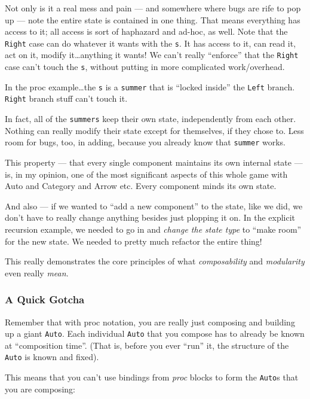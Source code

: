 \documentclass[]{article}
\begin{document}
Not only is it a real mess and pain --- and somewhere where bugs are rife to pop
up --- note the entire state is contained in one thing. That means everything
has access to it; all access is sort of haphazard and ad-hoc, as well. Note that
the \texttt{Right} case can do whatever it wants with the \texttt{s}. It has
access to it, can read it, act on it, modify it\ldots anything it wants! We
can't really ``enforce'' that the \texttt{Right} case can't touch the
\texttt{s}, without putting in more complicated work/overhead.

In the proc example\ldots the \texttt{s} is a \texttt{summer} that is ``locked
inside'' the \texttt{Left} branch. \texttt{Right} branch stuff can't touch it.

In fact, all of the \texttt{summers} keep their own state, independently from
each other. Nothing can really modify their state except for themselves, if they
chose to. Less room for bugs, too, in adding, because you already know that
\texttt{summer} works.

This property --- that every single component maintains its own internal state
--- is, in my opinion, one of the most significant aspects of this whole game
with Auto and Category and Arrow etc. Every component minds its own state.

And also --- if we wanted to ``add a new component'' to the state, like we did,
we don't have to really change anything besides just plopping it on. In the
explicit recursion example, we needed to go in and \emph{change the state type}
to ``make room'' for the new state. We needed to pretty much refactor the entire
thing!

This really demonstrates the core principles of what \emph{composability} and
\emph{modularity} even really \emph{mean}.

\subsubsection{A Quick Gotcha}\label{a-quick-gotcha}

Remember that with proc notation, you are really just composing and building up
a giant \texttt{Auto}. Each individual \texttt{Auto} that you compose has to
already be known at ``composition time''. (That is, before you ever ``run'' it,
the structure of the \texttt{Auto} is known and fixed).

This means that you can't use bindings from \emph{proc} blocks to form the
\texttt{Auto}s that you are composing:
\end{document}
